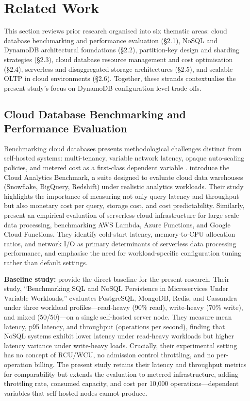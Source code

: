 \section{Related Work}

This section reviews prior research organised into six thematic areas: cloud database benchmarking and performance evaluation (§2.1), NoSQL and DynamoDB architectural foundations (§2.2), partition-key design and sharding strategies (§2.3), cloud database resource management and cost optimisation (§2.4), serverless and disaggregated storage architectures (§2.5), and scalable OLTP in cloud environments (§2.6). Together, these strands contextualise the present study's focus on DynamoDB configuration-level trade-offs.

\subsection{Cloud Database Benchmarking and Performance Evaluation}

Benchmarking cloud databases presents methodological challenges distinct from self-hosted systems: multi-tenancy, variable network latency, opaque auto-scaling policies, and metered cost as a first-class dependent variable \citep{vanrenen2023cloud}. \citet{vanrenen2023cloud} introduce the Cloud Analytics Benchmark, a suite designed to evaluate cloud data warehouses (Snowflake, BigQuery, Redshift) under realistic analytics workloads. Their study highlights the importance of measuring not only query latency and throughput but also monetary cost per query, storage cost, and cost predictability. Similarly, \citet{bodner2025serverless} present an empirical evaluation of serverless cloud infrastructure for large-scale data processing, benchmarking AWS Lambda, Azure Functions, and Google Cloud Functions. They identify cold-start latency, memory-to-CPU allocation ratios, and network I/O as primary determinants of serverless data processing performance, and emphasise the need for workload-specific configuration tuning rather than default settings.

\textbf{Baseline study:} \citet{pantelic2026benchmarking} provide the direct baseline for the present research. Their study, ``Benchmarking SQL and NoSQL Persistence in Microservices Under Variable Workloads,'' evaluates PostgreSQL, MongoDB, Redis, and Cassandra under three workload profiles—read-heavy (90\% read), write-heavy (70\% write), and mixed (50/50)—on a single self-hosted server node. They measure mean latency, p95 latency, and throughput (operations per second), finding that NoSQL systems exhibit lower latency under read-heavy workloads but higher latency variance under write-heavy loads. Crucially, their experimental setting has no concept of RCU/WCU, no admission control throttling, and no per-operation billing. The present study retains their latency and throughput metrics for comparability but extends the evaluation to metered infrastructure, adding throttling rate, consumed capacity, and cost per 10,000 operations—dependent variables that self-hosted nodes cannot produce.

